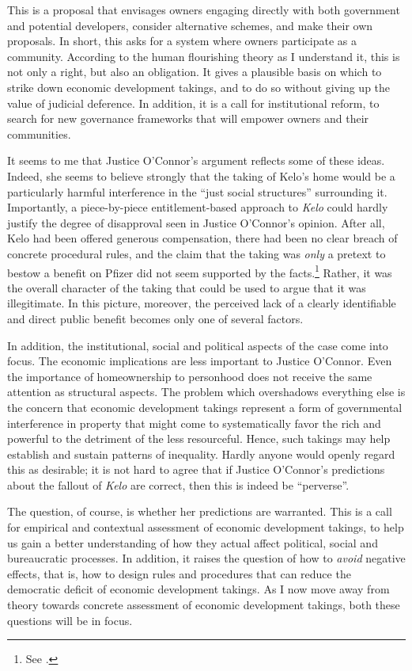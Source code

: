 This is a proposal that envisages owners engaging directly with both government and potential developers, consider alternative schemes, and make their own proposals. In short, this asks for a system where owners participate as a community. According to the human flourishing theory as I understand it, this is not only a right, but also an obligation. It gives a plausible basis on which to strike down economic development takings, and to do so without giving up the value of judicial deference. In addition, it is a call for institutional reform, to search for new governance frameworks that will empower owners and their communities.

It seems to me that Justice O'Connor's argument reflects some of these ideas. Indeed, she seems to believe strongly that the taking of Kelo's home would be a particularly harmful interference in the ``just social structures'' surrounding it. Importantly, a piece-by-piece entitlement-based approach to {\it Kelo} could hardly justify the degree of disapproval seen in Justice O'Connor's opinion. After all, Kelo had been offered generous compensation, there had been no clear breach of concrete procedural rules, and the claim that the taking was {\it only} a pretext to bestow a benefit on Pfizer did not seem supported by the facts.\footnote{See \cite{bell06}.} Rather, it was the overall character of the taking that could be used to argue that it was illegitimate. In this picture, moreover, the perceived lack of a clearly identifiable and direct public benefit becomes only one of several factors.

In addition, the institutional, social and political aspects of the case come into focus. The economic implications are less important to Justice O'Connor. Even the importance of homeownership to personhood does not receive the same attention as structural aspects. The problem which overshadows everything else is the concern that economic development takings represent a form of governmental interference in property that might come to systematically favor the rich and powerful to the detriment of the less resourceful. Hence, such takings may help establish and sustain patterns of inequality. Hardly anyone would openly regard this as desirable; it is not hard to agree that if Justice O'Connor's predictions about the fallout of {\it Kelo} are correct, then this is indeed be ``perverse''. 

The question, of course, is whether her predictions are warranted. This is a call for empirical and contextual assessment of economic development takings, to help us gain a better understanding of how they actual affect political, social and bureaucratic processes. In addition, it raises the question of how to {\it avoid} negative effects, that is, how to design rules and procedures that can reduce the democratic deficit of economic development takings. As I now move away from theory towards concrete assessment of economic development takings, both these questions will be in focus.

